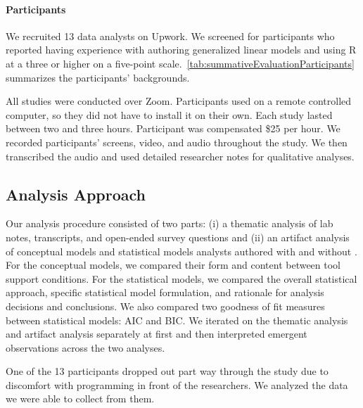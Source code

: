 \noindent \paragraph{Participants} We recruited 13 data analysts on Upwork. We
screened for participants who reported having experience with authoring
generalized linear models and using R at a three or higher on a five-point
scale.~\autoref{tab:summativeEvaluationParticipants} summarizes the participants' backgrounds. 


All studies were conducted over Zoom. Participants used \rTisane
on a remote controlled computer, so they did not have to install it on their
own. Each study lasted between two and three hours. Participant was compensated
\$25 per hour. We recorded participants' screens, video, and audio throughout
the study. We then transcribed the audio and used detailed researcher notes for
qualitative analyses.

\tableSummativeEvalParticipants

\subsection{Analysis Approach}
Our analysis procedure consisted of two parts: (i) a thematic analysis of lab
notes, transcripts, and open-ended survey questions and (ii) an artifact
analysis of conceptual models and statistical models analysts authored with and
without \rTisane. For the conceptual models, we compared their form and content
between tool support conditions. For the statistical models, we compared the
overall statistical approach, specific statistical model formulation, and
rationale for analysis decisions and conclusions. We also compared two goodness
of fit measures between statistical models: AIC and BIC. We iterated on the
thematic analysis and artifact analysis separately at first and then interpreted
emergent observations across the two analyses. 

One of the 13 participants dropped out part way through the study due to
discomfort with programming in front of the researchers. We analyzed the data we
were able to collect from them. 

